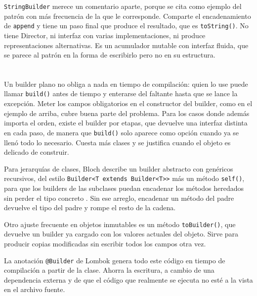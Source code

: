 \documentclass[10pt,a4paper]{article}
\begin{document}
\texttt{StringBuilder} merece un comentario aparte, porque se cita como ejemplo del patrón con más frecuencia de la que le corresponde. Comparte el encadenamiento de \texttt{append} y tiene un paso final que produce el resultado, que es \texttt{toString()}. No tiene Director, ni interfaz con varias implementaciones, ni produce representaciones alternativas. Es un acumulador mutable con interfaz fluida, que se parece al patrón en la forma de escribirlo pero no en su estructura.

\section{\color{colorIPN}{Variantes y ajustes}}

Un builder plano no obliga a nada en tiempo de compilación: quien lo use puede llamar \texttt{build()} antes de tiempo y enterarse del faltante hasta que se lance la excepción. Meter los campos obligatorios en el constructor del builder, como en el ejemplo de arriba, cubre buena parte del problema. Para los casos donde además importa el orden, existe el builder por etapas, que devuelve una interfaz distinta en cada paso, de manera que \texttt{build()} solo aparece como opción cuando ya se llenó todo lo necesario. Cuesta más clases y se justifica cuando el objeto es delicado de construir.

Para jerarquías de clases, Bloch describe un builder abstracto con genéricos recursivos, del estilo \texttt{Builder<T extends Builder<T>{>}} más un método \texttt{self()}, para que los builders de las subclases puedan encadenar los métodos heredados sin perder el tipo concreto \cite{bloch2018}. Sin ese arreglo, encadenar un método del padre devuelve el tipo del padre y rompe el resto de la cadena.

Otro ajuste frecuente en objetos inmutables es un método \texttt{toBuilder()}, que devuelve un builder ya cargado con los valores actuales del objeto. Sirve para producir copias modificadas sin escribir todos los campos otra vez.

La anotación \texttt{@Builder} de Lombok genera todo este código en tiempo de compilación a partir de la clase. Ahorra la escritura, a cambio de una dependencia externa y de que el código que realmente se ejecuta no esté a la vista en el archivo fuente.

\section{\color{colorIPN}{Cuándo no conviene usarlo}}
\end{document}

